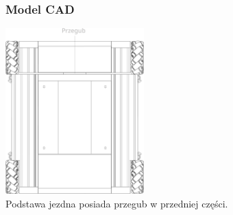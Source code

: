 \documentclass{beamer}
\begin{document}
	\begin{frame}
		\frametitle{Model CAD}
		\centering
		\includegraphics[width=0.4\textwidth]{graphics/base_top.pdf} \\
		Podstawa jezdna posiada przegub w przedniej części.
	\end{frame}
\end{document}
